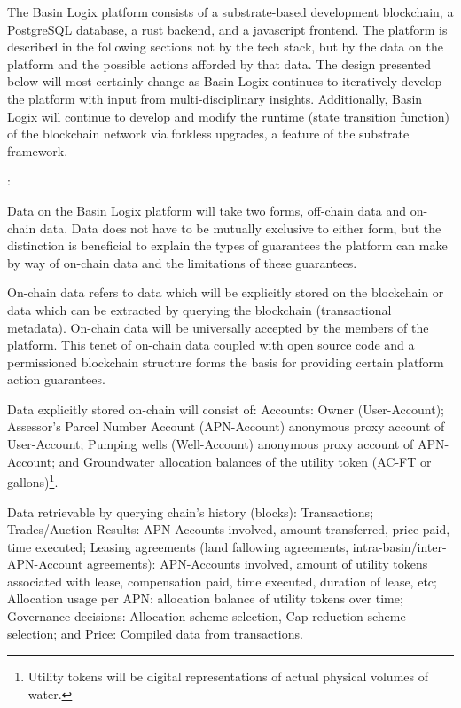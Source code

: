 \documentclass{tufte-handout}
\begin{document}
The Basin Logix platform consists of a substrate-based development blockchain, a PostgreSQL database, a rust backend, and a javascript frontend. The platform is described in the following sections not by the tech stack, but by the data on the platform and the possible actions afforded by that data. The design presented below will most certainly change as Basin Logix continues to iteratively develop the platform with input from multi-disciplinary insights. Additionally, Basin Logix will continue to develop and modify the runtime (state transition function) of the blockchain network via forkless upgrades, a feature of the substrate framework.


:

Data on the Basin Logix platform will take two forms, off-chain data and on-chain data. Data does not have to be mutually exclusive to either form, but the distinction is beneficial to explain the types of guarantees the platform can make by way of on-chain data and the limitations of these guarantees. 

On-chain data refers to data which will be explicitly stored on the blockchain or data which can be extracted by querying the blockchain (transactional metadata). On-chain data will be universally accepted by the members of the platform. This tenet of on-chain data coupled with open source code and a permissioned blockchain structure forms the basis for providing certain platform action guarantees.

Data explicitly stored on-chain will consist of: Accounts: Owner (User-Account); Assessor's Parcel Number Account (APN-Account) anonymous proxy account of User-Account; Pumping wells (Well-Account) anonymous proxy account of APN-Account; and Groundwater allocation balances of the utility token (AC-FT or gallons)\footnote{Utility tokens will be digital representations of actual physical volumes of water.}. 

Data retrievable by querying chain's history (blocks): Transactions; Trades/Auction Results: APN-Accounts involved, amount transferred, price paid, time executed; Leasing agreements (land fallowing agreements, intra-basin/inter-APN-Account agreements): APN-Accounts involved, amount of utility tokens associated with lease, compensation paid, time executed, duration of lease, etc; Allocation usage per APN: allocation balance of utility tokens over time; Governance decisions: Allocation scheme selection, Cap reduction scheme selection; and Price: Compiled data from transactions.
\end{document}
